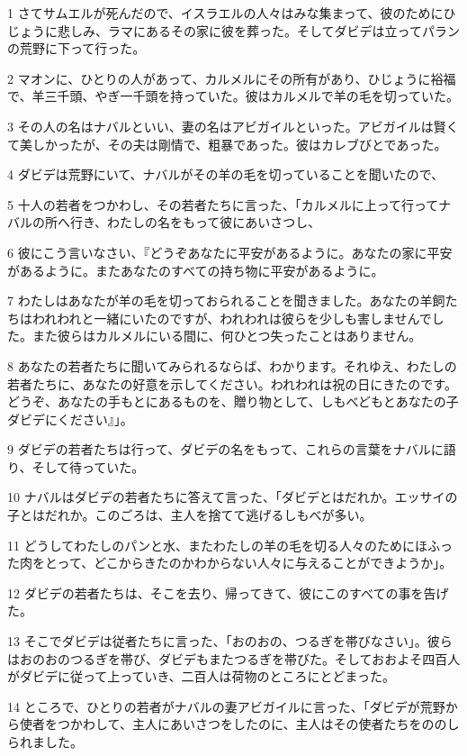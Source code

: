 \par 1 さてサムエルが死んだので、イスラエルの人々はみな集まって、彼のためにひじょうに悲しみ、ラマにあるその家に彼を葬った。そしてダビデは立ってパランの荒野に下って行った。
\par 2 マオンに、ひとりの人があって、カルメルにその所有があり、ひじょうに裕福で、羊三千頭、やぎ一千頭を持っていた。彼はカルメルで羊の毛を切っていた。
\par 3 その人の名はナバルといい、妻の名はアビガイルといった。アビガイルは賢くて美しかったが、その夫は剛情で、粗暴であった。彼はカレブびとであった。
\par 4 ダビデは荒野にいて、ナバルがその羊の毛を切っていることを聞いたので、
\par 5 十人の若者をつかわし、その若者たちに言った、「カルメルに上って行ってナバルの所へ行き、わたしの名をもって彼にあいさつし、
\par 6 彼にこう言いなさい、『どうぞあなたに平安があるように。あなたの家に平安があるように。またあなたのすべての持ち物に平安があるように。
\par 7 わたしはあなたが羊の毛を切っておられることを聞きました。あなたの羊飼たちはわれわれと一緒にいたのですが、われわれは彼らを少しも害しませんでした。また彼らはカルメルにいる間に、何ひとつ失ったことはありません。
\par 8 あなたの若者たちに聞いてみられるならば、わかります。それゆえ、わたしの若者たちに、あなたの好意を示してください。われわれは祝の日にきたのです。どうぞ、あなたの手もとにあるものを、贈り物として、しもべどもとあなたの子ダビデにください』」。
\par 9 ダビデの若者たちは行って、ダビデの名をもって、これらの言葉をナバルに語り、そして待っていた。
\par 10 ナバルはダビデの若者たちに答えて言った、「ダビデとはだれか。エッサイの子とはだれか。このごろは、主人を捨てて逃げるしもべが多い。
\par 11 どうしてわたしのパンと水、またわたしの羊の毛を切る人々のためにほふった肉をとって、どこからきたのかわからない人々に与えることができようか」。
\par 12 ダビデの若者たちは、そこを去り、帰ってきて、彼にこのすべての事を告げた。
\par 13 そこでダビデは従者たちに言った、「おのおの、つるぎを帯びなさい」。彼らはおのおのつるぎを帯び、ダビデもまたつるぎを帯びた。そしておおよそ四百人がダビデに従って上っていき、二百人は荷物のところにとどまった。
\par 14 ところで、ひとりの若者がナバルの妻アビガイルに言った、「ダビデが荒野から使者をつかわして、主人にあいさつをしたのに、主人はその使者たちをののしられました。
